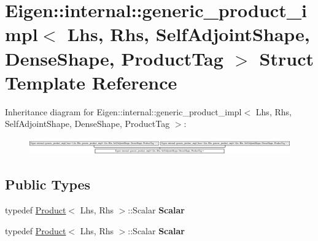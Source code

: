 \hypertarget{struct_eigen_1_1internal_1_1generic__product__impl_3_01_lhs_00_01_rhs_00_01_self_adjoint_shape_06e3f81c44c9a89e35e47ffcd48d159f9}{}\section{Eigen\+:\+:internal\+:\+:generic\+\_\+product\+\_\+impl$<$ Lhs, Rhs, Self\+Adjoint\+Shape, Dense\+Shape, Product\+Tag $>$ Struct Template Reference}
\label{struct_eigen_1_1internal_1_1generic__product__impl_3_01_lhs_00_01_rhs_00_01_self_adjoint_shape_06e3f81c44c9a89e35e47ffcd48d159f9}
Inheritance diagram for Eigen\+:\+:internal\+:\+:generic\+\_\+product\+\_\+impl$<$ Lhs, Rhs, Self\+Adjoint\+Shape, Dense\+Shape, Product\+Tag $>$\+:\begin{figure}[H]
\begin{center}
\leavevmode
\includegraphics[height=0.698254cm]{struct_eigen_1_1internal_1_1generic__product__impl_3_01_lhs_00_01_rhs_00_01_self_adjoint_shape_06e3f81c44c9a89e35e47ffcd48d159f9}
\end{center}
\end{figure}
\subsection*{Public Types}
\begin{DoxyCompactItemize}
\item 
\mbox{\label{struct_eigen_1_1internal_1_1generic__product__impl_3_01_lhs_00_01_rhs_00_01_self_adjoint_shape_06e3f81c44c9a89e35e47ffcd48d159f9_a6db408b4899bdb58e781c7a768fa7e2b}} 
typedef \hyperlink{group___core___module_class_eigen_1_1_product}{Product}$<$ Lhs, Rhs $>$\+::Scalar {\bfseries Scalar}
\item 
\mbox{\label{struct_eigen_1_1internal_1_1generic__product__impl_3_01_lhs_00_01_rhs_00_01_self_adjoint_shape_06e3f81c44c9a89e35e47ffcd48d159f9_a6db408b4899bdb58e781c7a768fa7e2b}} 
typedef \hyperlink{group___core___module_class_eigen_1_1_product}{Product}$<$ Lhs, Rhs $>$\+::Scalar {\bfseries Scalar}
\end{DoxyCompactItemize}

